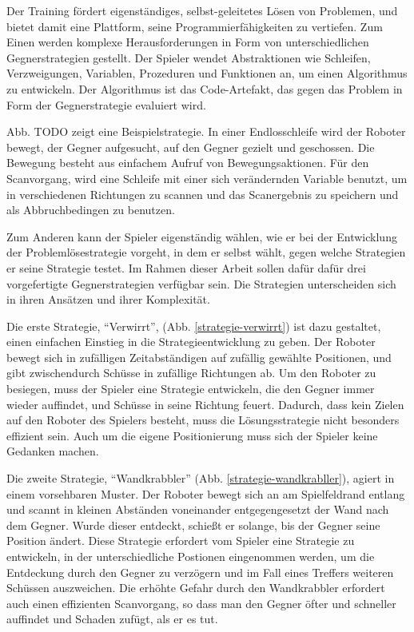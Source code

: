 Der Training fördert eigenständiges, selbst-geleitetes Lösen von Problemen, und bietet damit
eine Plattform, seine Programmierfähigkeiten zu vertiefen. Zum Einen werden komplexe
Herausforderungen in Form von unterschiedlichen Gegnerstrategien gestellt. Der Spieler
wendet Abstraktionen wie Schleifen, Verzweigungen, Variablen, Prozeduren und Funktionen an, um einen
Algorithmus zu entwickeln. Der Algorithmus ist das Code-Artefakt, das gegen das Problem in Form der 
Gegnerstrategie evaluiert wird.

Abb. TODO zeigt eine Beispielstrategie. In einer Endlosschleife wird der Roboter bewegt, der Gegner
aufgesucht, auf den Gegner gezielt und geschossen. Die Bewegung besteht aus einfachem Aufruf von
Bewegungsaktionen. Für den Scanvorgang, wird eine Schleife mit einer sich verändernden Variable
benutzt, um in verschiedenen Richtungen zu scannen und das Scanergebnis zu speichern und als
Abbruchbedingen zu benutzen.


Zum Anderen kann der Spieler eigenständig wählen, wie er bei der Entwicklung der
Problemlösestrategie vorgeht, in dem er selbst wählt, gegen welche Strategien er seine Strategie
testet. Im Rahmen dieser Arbeit sollen dafür dafür drei vorgefertigte Gegnerstrategien verfügbar
sein. Die Strategien unterscheiden sich in ihren Ansätzen und ihrer Komplexität.

Die erste Strategie, \enquote{Verwirrt}, (Abb. \ref{strategie-verwirrt}) ist dazu gestaltet, einen
einfachen Einstieg in die Strategieentwicklung zu geben. Der Roboter bewegt sich in zufälligen
Zeitabständigen auf zufällig gewählte Positionen, und gibt zwischendurch Schüsse in zufällige
Richtungen ab. Um den Roboter zu besiegen, muss der Spieler eine Strategie entwickeln, die den
Gegner immer wieder auffindet, und Schüsse in seine Richtung feuert. Dadurch, dass kein
Zielen auf den Roboter des Spielers besteht, muss die Lösungsstrategie nicht besonders effizient
sein. Auch um die eigene Positionierung muss sich der Spieler keine Gedanken machen.

Die zweite Strategie, \enquote{Wandkrabbler} (Abb. \ref{strategie-wandkrabller}), agiert in einem
vorsehbaren Muster. Der Roboter bewegt sich an am Spielfeldrand entlang und scannt in kleinen
Abständen voneinander entgegengesetzt der Wand nach dem Gegner. Wurde dieser entdeckt, schießt er
solange, bis der Gegner seine Position ändert. Diese Strategie erfordert vom Spieler eine Strategie
zu entwickeln, in der unterschiedliche Postionen eingenommen werden, um die Entdeckung durch den
Gegner zu verzögern und im Fall eines Treffers weiteren Schüssen auszweichen. Die erhöhte Gefahr
durch den Wandkrabbler erfordert auch einen effizienten Scanvorgang, so dass man den Gegner öfter
und schneller auffindet und Schaden zufügt, als er es tut.

